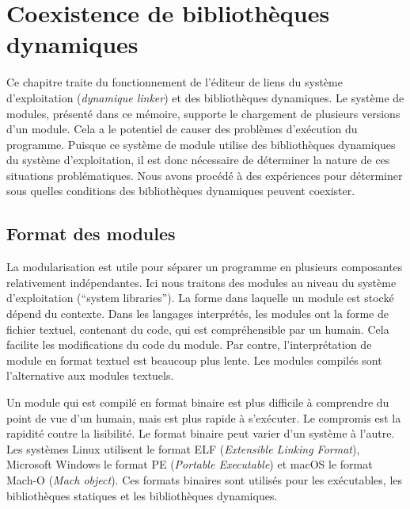 \chapter{Coexistence de bibliothèques dynamiques}
\label{ch:module_systems}


Ce chapitre traite du fonctionnement de l'éditeur de liens du système
d'exploitation (\textit{dynamique linker}) et des bibliothèques dynamiques. Le
système de modules, présenté dans ce mémoire, supporte le chargement de
plusieurs versions d'un module. Cela a le potentiel de causer des problèmes
d'exécution du programme. Puisque ce système de module utilise des bibliothèques
dynamiques du système d'exploitation, il est donc nécessaire de déterminer la nature
de ces situations problématiques. Nous avons procédé à des expériences pour
déterminer sous quelles conditions des bibliothèques dynamiques peuvent coexister.

\section{Format des modules}


La modularisation est utile pour séparer un programme en plusieurs composantes
relativement indépendantes. Ici nous traitons des modules au niveau du système
d'exploitation (``system libraries''). La forme dans laquelle un module est
stocké dépend du contexte. Dans les langages interprétés, les modules ont la
forme de fichier textuel, contenant du code, qui est compréhensible par un
humain. Cela facilite les modifications du code du module. Par contre,
l'interprétation de module en format textuel est beaucoup plus lente. Les
modules compilés sont l'alternative aux modules textuels.

Un module qui est compilé en format binaire est plus difficile à comprendre
du point de vue d'un humain, mais est plus rapide à s'exécuter. Le compromis
est la rapidité contre la lisibilité. Le format binaire peut varier d'un système
à l'autre. Les systèmes Linux utilisent le format ELF (\textit{Extensible Linking
Format}), Microsoft Windows le format PE (\textit{Portable Executable})
et macOS le format Mach-O (\textit{Mach object}). Ces formats binaires sont
utilisés pour les exécutables, les bibliothèques statiques et les bibliothèques
dynamiques.

